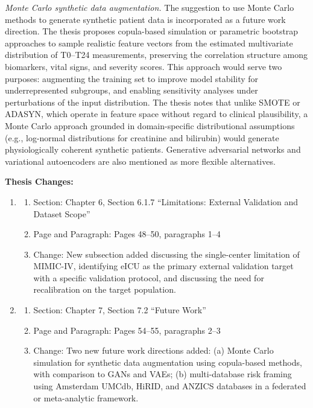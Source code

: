 \documentclass[12pt,a4paper]{article}
\begin{document}
\begin{flushleft}
\textit{Monte Carlo synthetic data augmentation.} The suggestion to use Monte Carlo methods to generate synthetic patient data is incorporated as a future work direction. The thesis proposes copula-based simulation or parametric bootstrap approaches to sample realistic feature vectors from the estimated multivariate distribution of T0--T24 measurements, preserving the correlation structure among biomarkers, vital signs, and severity scores. This approach would serve two purposes: augmenting the training set to improve model stability for underrepresented subgroups, and enabling sensitivity analyses under perturbations of the input distribution. The thesis notes that unlike SMOTE or ADASYN, which operate in feature space without regard to clinical plausibility, a Monte Carlo approach grounded in domain-specific distributional assumptions (e.g., log-normal distributions for creatinine and bilirubin) would generate physiologically coherent synthetic patients. Generative adversarial networks and variational autoencoders are also mentioned as more flexible alternatives.

\vspace{\baselineskip}

\textbf{Thesis Changes:}
\begin{enumerate}
    \item
    \begin{enumerate}
        \item Section: Chapter 6, Section 6.1.7 ``Limitations: External Validation and Dataset Scope''
        \item Page and Paragraph: Pages 48--50, paragraphs 1--4
        \item Change: New subsection added discussing the single-center limitation of MIMIC-IV, identifying eICU as the primary external validation target with a specific validation protocol, and discussing the need for recalibration on the target population.
    \end{enumerate}
    \item
    \begin{enumerate}
        \item Section: Chapter 7, Section 7.2 ``Future Work''
        \item Page and Paragraph: Pages 54--55, paragraphs 2--3
        \item Change: Two new future work directions added: (a) Monte Carlo simulation for synthetic data augmentation using copula-based methods, with comparison to GANs and VAEs; (b) multi-database risk framing using Amsterdam UMCdb, HiRID, and ANZICS databases in a federated or meta-analytic framework.
    \end{enumerate}
\end{enumerate}


\end{flushleft}
\end{document}
